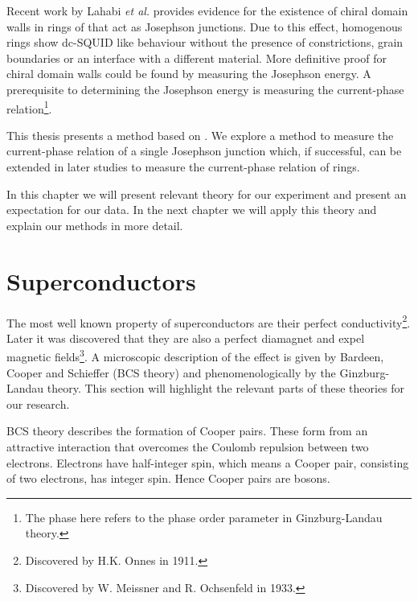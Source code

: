Recent work by Lahabi \textit{et al.} provides evidence for the existence of chiral domain walls in rings of \cite{lahabiSpintripletSupercurrentsOdd2018} that act as Josephson junctions. Due to this effect, homogenous  rings show dc-SQUID like behaviour without the presence of constrictions, grain boundaries or an interface with a different material. More definitive proof for chiral domain walls could be found by measuring the Josephson energy\cite{lahabiSpintripletSupercurrentsOdd2018}. A prerequisite to determining the Josephson energy is measuring the current-phase relation\footnote{The phase here refers to the phase order parameter in Ginzburg-Landau theory.}.

This thesis presents a method based on \citeauthor{frolovMeasurementCurrentPhaseRelation2004} \citeyear{frolovMeasurementCurrentPhaseRelation2004}. We explore a method to measure the current-phase relation of a single Josephson junction which, if successful, can be extended in later studies to measure the current-phase relation of  rings.

In this chapter we will present relevant theory for our experiment and present an expectation for our data. In the next chapter we will apply this theory and explain our methods in more detail.

\section{Superconductors}
The most well known property of superconductors are their perfect conductivity\footnote{Discovered by H.K. Onnes in 1911.}. Later it was discovered that they are also a perfect diamagnet and expel magnetic fields\footnote{Discovered by W. Meissner and R. Ochsenfeld in 1933.}. A microscopic description of the effect is given by Bardeen, Cooper and Schieffer (BCS theory) and phenomenologically by the Ginzburg-Landau theory\cite{tinkhamIntroductionSuperconductivity}. This section will highlight the relevant parts of these theories for our research.

BCS theory describes the formation of Cooper pairs. These form from an attractive interaction that overcomes the Coulomb repulsion between two electrons\cite{bardeenTheorySuperconductivity1957}. Electrons have half-integer spin, which means a Cooper pair, consisting of two electrons, has integer spin. Hence Cooper pairs are bosons.

